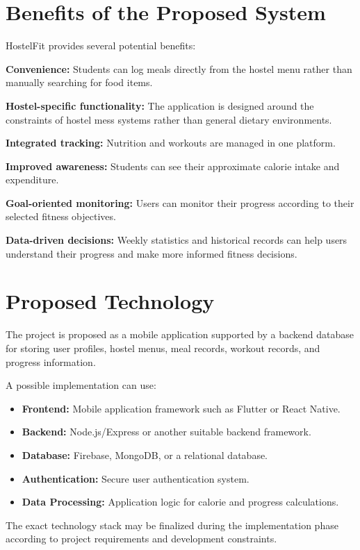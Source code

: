 \documentclass[11pt,a4paper]{article}
\begin{document}
\section{Benefits of the Proposed System}

HostelFit provides several potential benefits:

\textbf{Convenience:} Students can log meals directly from the hostel menu rather than manually searching for food items.

\textbf{Hostel-specific functionality:} The application is designed around the constraints of hostel mess systems rather than general dietary environments.

\textbf{Integrated tracking:} Nutrition and workouts are managed in one platform.

\textbf{Improved awareness:} Students can see their approximate calorie intake and expenditure.

\textbf{Goal-oriented monitoring:} Users can monitor their progress according to their selected fitness objectives.

\textbf{Data-driven decisions:} Weekly statistics and historical records can help users understand their progress and make more informed fitness decisions.

\section{Proposed Technology}

The project is proposed as a mobile application supported by a backend database for storing user profiles, hostel menus, meal records, workout records, and progress information.

A possible implementation can use:
\begin{itemize}
    \item \textbf{Frontend:} Mobile application framework such as Flutter or React Native.
    \item \textbf{Backend:} Node.js/Express or another suitable backend framework.
    \item \textbf{Database:} Firebase, MongoDB, or a relational database.
    \item \textbf{Authentication:} Secure user authentication system.
    \item \textbf{Data Processing:} Application logic for calorie and progress calculations.
\end{itemize}

The exact technology stack may be finalized during the implementation phase according to project requirements and development constraints.
\end{document}
